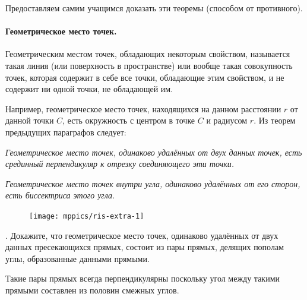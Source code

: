 \medskip

Предоставляем самим учащимся доказать эти теоремы (способом от противного).

\paragraph{Геометрическое место точек.}\label{1938/60}
Геометрическим местом точек, обладающих некоторым свойством, называется такая линия (или поверхность в пространстве) или вообще такая совокупность точек, которая содержит в себе все точки, обладающие этим свойством, и не содержит ни одной точки, не обладающей им.

Например, геометрическое место точек, находящихся на данном расстоянии $r$ от данной точки $C$, есть окружность с центром в точке $C$ и радиусом $r$.
Из теорем предыдущих параграфов следует:

\emph{Геометрическое место точек, одинаково удалённых от двух данных точек, есть срединный перпендикуляр к отрезку соединяющего эти точки.} 

\emph{Геометрическое место точек внутри угла, одинаково удалённых от его сторон, есть биссектриса этого угла.}

\begin{figure}
\vskip3mm
\centering
\texttt{[image: mppics/ris-extra-1]}
\caption{}\label{extra/1}
\end{figure}

\smallskip
\mbox{.} Докажите, что геометрическое место точек, одинаково удалённых от двух данных пресекающихся прямых, состоит из пары прямых, делящих пополам углы, образованные данными прямыми.

Такие пары прямых всегда перпендикулярны поскольку угол между такими прямыми составлен из половин смежных углов.
